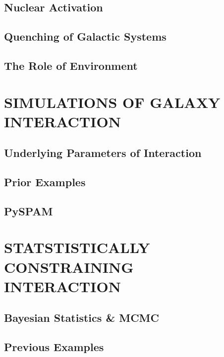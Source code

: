 \subsection{Nuclear Activation}
\subsection{Quenching of Galactic Systems}
\subsection{The Role of Environment}

\section{SIMULATIONS OF GALAXY INTERACTION}

\subsection{Underlying Parameters of Interaction}

\subsection{Prior Examples}

\subsection{PySPAM}

\section{STATSTISTICALLY CONSTRAINING INTERACTION}

\subsection{Bayesian Statistics \& MCMC}

\subsection{Previous Examples}

